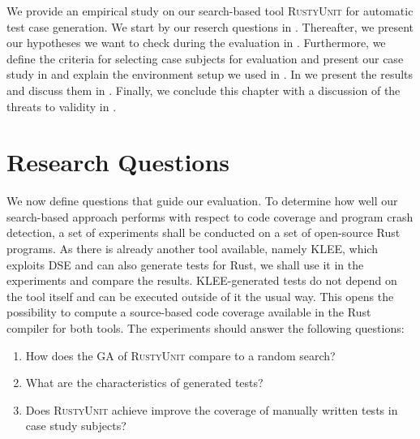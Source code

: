 \documentclass[paper=a4,%
  twoside,%
  BCOR4mm,%
  abstract=true,%
  toc=bibliography,%
  chapterprefix=true,%
  toc=bibliographynumbered,%
  open=right,%
  english,%
  pagesize=pdftex]{scrreprt}
\newcommand{\tech}{\textsc{RustyUnit}\xspace}
\begin{document}
We provide an empirical study on our search-based tool \tech for automatic test case generation. We start by our reserch questions in . Thereafter, we present our hypotheses we want to check during the evaluation in . Furthermore, we define the criteria for selecting case subjects for evaluation and present our case study in  and explain the environment setup we used in . In  we present the results and discuss them in . Finally, we conclude this chapter with a discussion of the threats to validity in .


\section{Research Questions}
\label{sec:research-questions}
We now define questions that guide our evaluation. To determine how well our search-based approach performs with respect to code coverage and program crash detection, a set of experiments shall be conducted on a set of open-source Rust programs. As there is already another tool available, namely \textsc{KLEE}, which exploits \ac{DSE} and can also generate tests for Rust, we shall use it in the experiments and compare the results. \textsc{KLEE}-generated tests do not depend on the tool itself and can be executed outside of it the usual way. This opens the possibility to compute a source-based code coverage available in the Rust compiler for both tools. The experiments should answer the following questions:


\begin{enumerate}[start=1, label={\bfseries RQ\arabic*:}]
    \item How does the \ac{GA} of \tech compare to a random search?
    \item What are the characteristics of generated tests? 
    
    \item Does \tech achieve improve the coverage of manually written tests in case study subjects?
\end{enumerate} 
\end{document}

